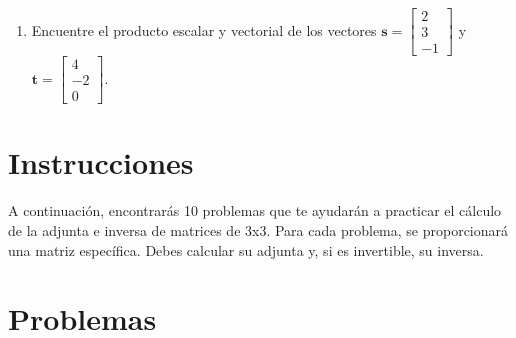 \documentclass[10pt,a4paper]{article}
\begin{document}
\begin{enumerate}[resume]
    \item Encuentre el producto escalar y vectorial de los vectores $\mathbf{s} = \begin{bmatrix} 2 \\ 3 \\ -1 \end{bmatrix}$ y $\mathbf{t} = \begin{bmatrix} 4 \\ -2 \\ 0 \end{bmatrix}$.
\end{enumerate}

% 
% 
% 
% 
% 
\section*{Instrucciones}
A continuación, encontrarás 10 problemas que te ayudarán a practicar el cálculo de la adjunta e inversa de matrices de 3x3. Para cada problema, se proporcionará una matriz específica. Debes calcular su adjunta y, si es invertible, su inversa. 

\section*{Problemas}
\end{document}

